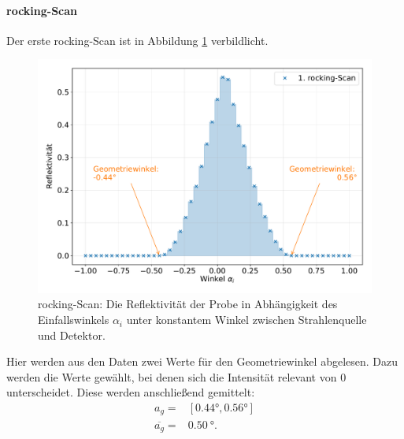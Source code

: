 \FloatBarrier
\paragraph{rocking-Scan}
Der erste rocking-Scan ist in Abbildung \ref{fig:rock} verbildlicht.
\begin{figure}[h!]
  \centering
  \includegraphics[width=\textwidth]{content/images/done_plot_rockingscan.pdf}
  \caption{rocking-Scan: Die Reflektivität der Probe in Abhängigkeit des Einfallswinkels $\alpha_i$ unter konstantem Winkel zwischen Strahlenquelle und Detektor.}
  \label{fig:rock}
\end{figure}
Hier werden aus den Daten zwei Werte für den Geometriewinkel abgelesen.
Dazu werden die Werte gewählt, bei denen sich die Intensität relevant von 0 unterscheidet.
Diese werden anschließend gemittelt:
\begin{align*}
	a_g 			= & [0.44°, 0.56°] \\
	\overline{a_g}	= & \SI{0.50}{°}. \\
\end{align*}

